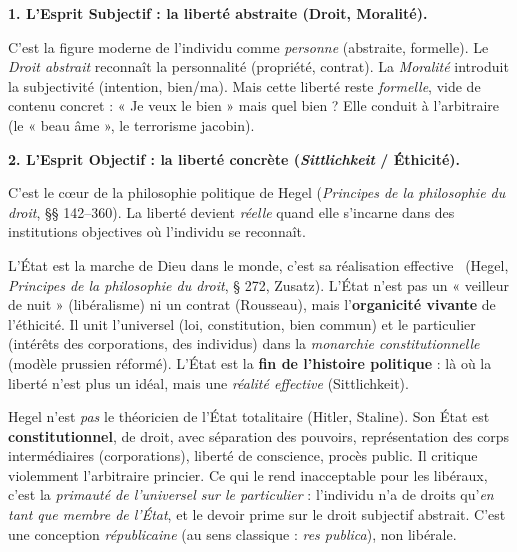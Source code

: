\documentclass[11pt]{article}
\begin{document}
\textbf{1. L'Esprit Subjectif : la liberté abstraite (Droit, Moralité).}\par
C'est la figure moderne de l'individu comme \emph{personne} (abstraite, formelle). Le \emph{Droit abstrait} reconnaît la personnalité (propriété, contrat). La \emph{Moralité} introduit la subjectivité (intention, bien/ma). Mais cette liberté reste \emph{formelle}, vide de contenu concret : « Je veux le bien » mais quel bien ? Elle conduit à l'arbitraire (le « beau âme », le terrorisme jacobin).

\textbf{2. L'Esprit Objectif : la liberté concrète (\emph{Sittlichkeit} / Éthicité).}\par
C'est le cœur de la philosophie politique de Hegel (\emph{Principes de la philosophie du droit}, §§ 142--360). La liberté devient \emph{réelle} quand elle s'incarne dans des institutions objectives où l'individu se reconnaît.

\begin{definition}
\guillemotleft L'État est la marche de Dieu dans le monde, c'est sa réalisation effective \guillemotright\ (Hegel, \emph{Principes de la philosophie du droit}, § 272, Zusatz). L'État n'est pas un « veilleur de nuit » (libéralisme) ni un contrat (Rousseau), mais l'\textbf{organicité vivante} de l'éthicité. Il unit l'universel (loi, constitution, bien commun) et le particulier (intérêts des corporations, des individus) dans la \emph{monarchie constitutionnelle} (modèle prussien réformé). L'État est la \textbf{fin de l'histoire politique} : là où la liberté n'est plus un idéal, mais une \emph{réalité effective} (Sittlichkeit).
\end{definition}

\begin{attention}
Hegel n'est \emph{pas} le théoricien de l'État totalitaire (Hitler, Staline). Son État est \textbf{constitutionnel}, de droit, avec séparation des pouvoirs, représentation des corps intermédiaires (corporations), liberté de conscience, procès public. Il critique violemment l'arbitraire princier. Ce qui le rend inacceptable pour les libéraux, c'est la \emph{primauté de l'universel sur le particulier} : l'individu n'a de droits qu'\emph{en tant que membre de l'État}, et le devoir prime sur le droit subjectif abstrait. C'est une conception \emph{républicaine} (au sens classique : \emph{res publica}), non libérale.
\end{attention}
\end{document}
